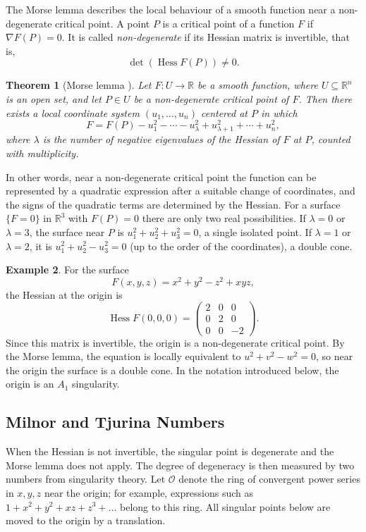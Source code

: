 \documentclass[12pt, a4paper, oneside]{book}
\theoremstyle{plain}
\newtheorem{theorem}{Theorem}[chapter]
\theoremstyle{definition}
\newtheorem{example}[theorem]{Example}
\theoremstyle{remark}
\theoremstyle{definition}
\begin{document}
The Morse lemma describes the local behaviour of a smooth function near a non-degenerate critical point. A point $P$ is a critical point of a function $F$ if $\nabla F(P)=0$. It is called \emph{non-degenerate} if its Hessian matrix is invertible, that is,
\[
\det(\operatorname{Hess}F(P))\neq 0.
\]

\begin{theorem}[Morse lemma \cite{milnor1963morse}]
\label{thm:morse}
Let $F:U\to\mathbb R$ be a smooth function, where $U\subseteq\mathbb R^n$ is an open set, and let $P\in U$ be a non-degenerate critical point of $F$. Then there exists a local coordinate system $(u_1,\dots,u_n)$ centered at $P$ in which
\[
F=F(P)-u_1^2-\cdots-u_\lambda^2+u_{\lambda+1}^2+\cdots+u_n^2,
\]
where $\lambda$ is the number of negative eigenvalues of the Hessian of $F$ at $P$, counted with multiplicity.
\end{theorem}

In other words, near a non-degenerate critical point the function can be represented by a quadratic expression after a suitable change of coordinates, and the signs of the quadratic terms are determined by the Hessian. For a surface $\{F=0\}$ in $\mathbb{R}^3$ with $F(P)=0$ there are only two real possibilities. If $\lambda=0$ or $\lambda=3$, the surface near $P$ is $u_1^2+u_2^2+u_3^2=0$, a single isolated point. If $\lambda=1$ or $\lambda=2$, it is $u_1^2+u_2^2-u_3^2=0$ (up to the order of the coordinates), a double cone.

\begin{example}
\label{ex:morse}
For the surface
\[
F(x,y,z)=x^2+y^2-z^2+xyz,
\]
the Hessian at the origin is
\[
\operatorname{Hess}F(0,0,0)=
\begin{pmatrix}
2&0&0\\
0&2&0\\
0&0&-2
\end{pmatrix}.
\]
Since this matrix is invertible, the origin is a non-degenerate critical point. By the Morse lemma, the equation is locally equivalent to $u^2+v^2-w^2=0$, so near the origin the surface is a double cone. In the notation introduced below, the origin is an $A_1$ singularity.
\end{example}

\subsection{Milnor and Tjurina Numbers}

When the Hessian is not invertible, the singular point is degenerate and the Morse lemma does not apply. The degree of degeneracy is then measured by two numbers from singularity theory. Let $\mathcal{O}$ denote the ring of convergent power series in $x,y,z$ near the origin; for example, expressions such as $1+x^2+y^2+xz+z^3+\dots$ belong to this ring. All singular points below are moved to the origin by a translation.
\end{document}
